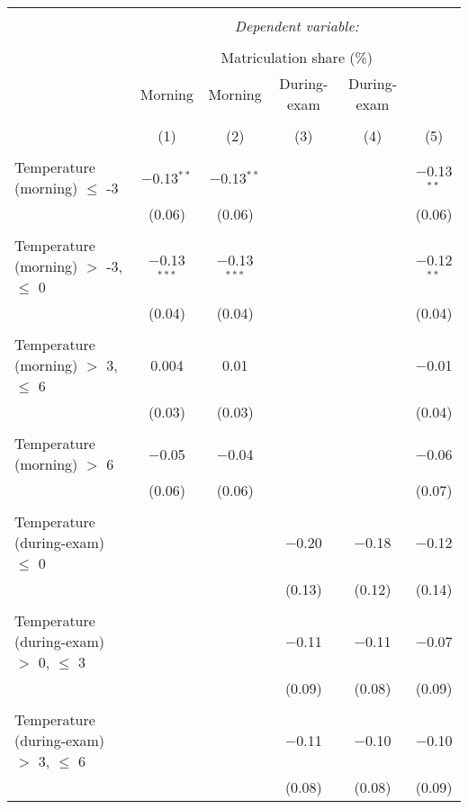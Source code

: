 
\begin{tabular}{@{\extracolsep{5pt}}lccccc} 
\\[-1.8ex]\hline 
\hline \\[-1.8ex] 
 & \multicolumn{5}{c}{\textit{Dependent variable:}} \\ 
\cline{2-6} 
\\[-1.8ex] & \multicolumn{5}{c}{Matriculation share (\%)} \\ 
 & Morning & Morning & During-exam & During-exam &  \\ 
\\[-1.8ex] & (1) & (2) & (3) & (4) & (5)\\ 
\hline \\[-1.8ex] 
 Temperature (morning) $\le$ -3 & $-$0.13$^{**}$ & $-$0.13$^{**}$ &  &  & $-$0.13$^{**}$ \\ 
  & (0.06) & (0.06) &  &  & (0.06) \\ 
  & & & & & \\ 
 Temperature (morning) $>$ -3, $\le$ 0 & $-$0.13$^{***}$ & $-$0.13$^{***}$ &  &  & $-$0.12$^{**}$ \\ 
  & (0.04) & (0.04) &  &  & (0.04) \\ 
  & & & & & \\ 
 Temperature (morning) $>$ 3, $\le$ 6 & 0.004 & 0.01 &  &  & $-$0.01 \\ 
  & (0.03) & (0.03) &  &  & (0.04) \\ 
  & & & & & \\ 
 Temperature (morning) $>$ 6 & $-$0.05 & $-$0.04 &  &  & $-$0.06 \\ 
  & (0.06) & (0.06) &  &  & (0.07) \\ 
  & & & & & \\ 
 Temperature (during-exam) $\le$ 0 &  &  & $-$0.20 & $-$0.18 & $-$0.12 \\ 
  &  &  & (0.13) & (0.12) & (0.14) \\ 
  & & & & & \\ 
 Temperature (during-exam) $>$ 0, $\le$ 3 &  &  & $-$0.11 & $-$0.11 & $-$0.07 \\ 
  &  &  & (0.09) & (0.08) & (0.09) \\ 
  & & & & & \\ 
 Temperature (during-exam) $>$ 3, $\le$ 6 &  &  & $-$0.11 & $-$0.10 & $-$0.10 \\ 
  &  &  & (0.08) & (0.08) & (0.09) \\ 

\end{tabular}
